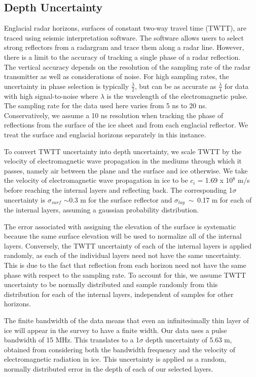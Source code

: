 \documentclass[12pt]{article}
\begin{document}
\subsection{Depth Uncertainty }\label{radunc}
Englacial radar horizons, surfaces of constant two-way travel time (TWTT), are traced using seismic interpretation software. The software allows users to select strong reflectors from a radargram and trace them along a radar line. However, there is a limit to the accuracy of tracking a single phase of a radar reflection. The vertical accuracy depends on the resolution of the sampling rate of the radar transmitter as well as considerations of noise. For high sampling rates, the uncertainty in phase selection is typically $\frac{\lambda}{2}$, but can be as accurate as $\frac{\lambda}{4}$ for data with high signal-to-noise where $\lambda$ is the wavelength of the electromagnetic pulse.  The sampling rate for the data used here varies from 5 ns to 20 ns. Conservatively, we assume a 10 ns resolution when tracking the phase of reflections from the surface of the ice sheet and from each englacial reflector. We treat the surface and englacial horizons separately in this instance. 

To convert TWTT uncertainty into depth uncertainty, we scale TWTT by the velocity of electromagnetic wave propagation in the mediums through which it passes, namely air between the plane and the surface and ice otherwise. We take the velocity of electromagnetic wave propagation in ice to be $\textit{c}_i$ = 1.69 x 10$^8$ m/s before reaching the internal layers and reflecting back. The corresponding 1$\sigma$ uncertainty is $\sigma_{surf}$ $\sim$0.3 m for the surface reflector and $\sigma_{lay}~\sim~$0.17 m for each of the internal layers, assuming a gaussian probability distribution.
 
The error associated with assigning the elevation of the surface is systematic because the same surface elevation will be used to normalize all of the internal layers. Conversely, the TWTT uncertainty of each of the internal layers is applied randomly, as each of the individual layers need not have the same uncertainty. This is due to the fact that reflection from each horizon need not  have the same phase with respect to the sampling rate. To account for this, we assume TWTT uncertainty to be normally distributed and sample randomly from this distribution for each of the internal layers, independent of samples for other horizons.

The finite bandwidth of the data means that even an infinitesimally thin layer of ice will appear in the survey to have a finite width. Our data uses a pulse bandwidth of 15 MHz. This translates to a 1$\sigma$ depth uncertainty of 5.63 m, obtained from considering both the bandwidth frequency and the velocity of electromagnetic radiation in ice. This uncertainty is applied as a random, normally distributed error in the depth of each of our selected layers. 
\end{document}
